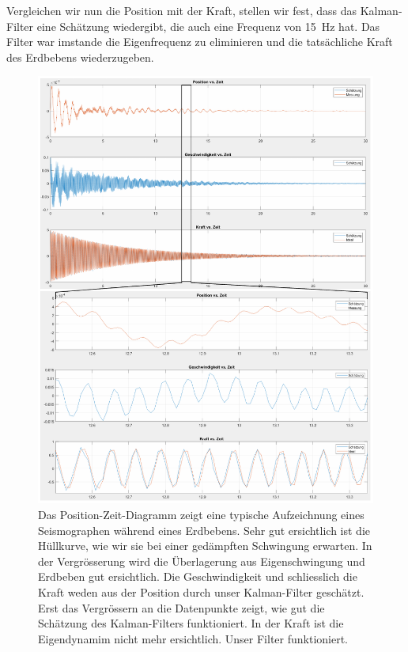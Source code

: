 Vergleichen wir nun die Position mit der Kraft, stellen wir fest, dass das Kalman-Filter eine Schätzung wiedergibt, die auch eine Frequenz von \SI{15}{\hertz} hat.
Das Filter war imstande die Eigenfrequenz zu eliminieren und die tatsächliche Kraft des Erdbebens wiederzugeben.

\begin{figure}
  \begin{center}
    \includegraphics[width=.95\linewidth,keepaspectratio]{papers/erdbeben/images/standard.PDF}
    \caption{
      Das Position-Zeit-Diagramm zeigt eine typische Aufzeichnung eines Seismographen während eines Erdbebens.
      Sehr gut ersichtlich ist die Hüllkurve, wie wir sie bei einer gedämpften Schwingung erwarten.
      In der Vergrösserung wird die Überlagerung aus Eigenschwingung und Erdbeben gut ersichtlich.
      Die Geschwindigkeit und schliesslich die Kraft weden aus der Position durch unser Kalman-Filter geschätzt.
      Erst das Vergrössern an die Datenpunkte zeigt, wie gut die Schätzung des Kalman-Filters funktioniert.
      In der Kraft ist die Eigendynamim nicht mehr ersichtlich. Unser Filter funktioniert.
      }
    \label{erdbeben:fig:standard-alles}
  \end{center}
\end{figure}

